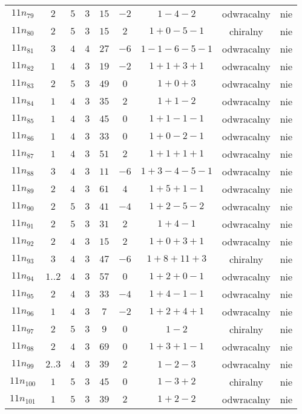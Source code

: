 \begin{longtable}{ccccccccc}
$11n_{79}$ & $2$ & $5$ & $3$ & $15$ & $-2$ & $1-4-2$ & odwracalny & nie \\
$11n_{80}$ & $2$ & $5$ & $3$ & $15$ & $2$ & $1+0-5-1$ & chiralny & nie \\
$11n_{81}$ & $3$ & $4$ & $4$ & $27$ & $-6$ & $1-1-6-5-1$ & odwracalny & nie \\
$11n_{82}$ & $1$ & $4$ & $3$ & $19$ & $-2$ & $1+1+3+1$ & odwracalny & nie \\
$11n_{83}$ & $2$ & $5$ & $3$ & $49$ & $0$ & $1+0+3$ & odwracalny & nie \\
$11n_{84}$ & $1$ & $4$ & $3$ & $35$ & $2$ & $1+1-2$ & odwracalny & nie \\
$11n_{85}$ & $1$ & $4$ & $3$ & $45$ & $0$ & $1+1-1-1$ & odwracalny & nie \\
$11n_{86}$ & $1$ & $4$ & $3$ & $33$ & $0$ & $1+0-2-1$ & odwracalny & nie \\
$11n_{87}$ & $1$ & $4$ & $3$ & $51$ & $2$ & $1+1+1+1$ & odwracalny & nie \\
$11n_{88}$ & $3$ & $4$ & $3$ & $11$ & $-6$ & $1+3-4-5-1$ & odwracalny & nie \\
$11n_{89}$ & $2$ & $4$ & $3$ & $61$ & $4$ & $1+5+1-1$ & odwracalny & nie \\
$11n_{90}$ & $2$ & $5$ & $3$ & $41$ & $-4$ & $1+2-5-2$ & odwracalny & nie \\
$11n_{91}$ & $2$ & $5$ & $3$ & $31$ & $2$ & $1+4-1$ & odwracalny & nie \\
$11n_{92}$ & $2$ & $4$ & $3$ & $15$ & $2$ & $1+0+3+1$ & odwracalny & nie \\
$11n_{93}$ & $3$ & $4$ & $3$ & $47$ & $-6$ & $1+8+11+3$ & chiralny & nie \\
$11n_{94}$ & $1..2$ & $4$ & $3$ & $57$ & $0$ & $1+2+0-1$ & odwracalny & nie \\
$11n_{95}$ & $2$ & $4$ & $3$ & $33$ & $-4$ & $1+4-1-1$ & odwracalny & nie \\
$11n_{96}$ & $1$ & $4$ & $3$ & $7$ & $-2$ & $1+2+4+1$ & odwracalny & nie \\
$11n_{97}$ & $2$ & $5$ & $3$ & $9$ & $0$ & $1-2$ & chiralny & nie \\
$11n_{98}$ & $2$ & $4$ & $3$ & $69$ & $0$ & $1+3+1-1$ & odwracalny & nie \\
$11n_{99}$ & $2..3$ & $4$ & $3$ & $39$ & $2$ & $1-2-3$ & odwracalny & nie \\
$11n_{100}$ & $1$ & $5$ & $3$ & $45$ & $0$ & $1-3+2$ & chiralny & nie \\
$11n_{101}$ & $1$ & $5$ & $3$ & $39$ & $2$ & $1+2-2$ & odwracalny & nie \\

\end{longtable}
